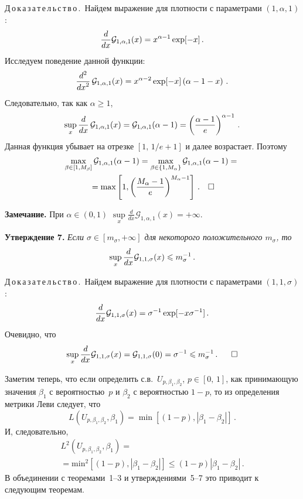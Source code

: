 \begin{multicols}{2}
\smallskip

\noindent
Д\,о\,к\,а\,з\,а\,т\,е\,л\,ь\,с\,т\,в\,о\,.\ 
Найдем выражение для плотности с параметрами $(1,\alpha,1)$:
$$
\displaystyle\frac{\displaystyle d\mathstrut}{\displaystyle dx\mathstrut}{\mathcal G}_{1,\alpha,1}(x) = x^{\alpha-1}\exp [-x]\,.
$$
Исследуем поведение данной функции:
$$
\displaystyle\frac{\displaystyle d^2\mathstrut}{\displaystyle dx^2\mathstrut}\,{\mathcal G}_{1,\alpha,1}(x) =
x^{\alpha-2}\exp[-x]\left(\alpha-1-x\right)\,.
$$
Следовательно, так как $\alpha\geqslant1$,
$$
\sup\limits_x \displaystyle\frac{\displaystyle d\mathstrut}{\displaystyle dx\mathstrut}\,{\mathcal G}_{1,\alpha,1}(x) = {\mathcal
G}_{1,\alpha,1}( \alpha-1 ) =
\left(\displaystyle\frac{\displaystyle \alpha-1\mathstrut}{\displaystyle e\mathstrut}\right)^{\alpha-1}\,.
$$
Данная функция убывает на отрезке $[1,\,1/e+1]$ и далее
возрастает. Поэтому
\begin{multline*}
\max\limits_{\beta\in[1,M_{\beta}]} {\mathcal
G}_{1,\alpha,1}(\alpha-1) = \max\limits_{\beta\in\{1,M_{\alpha}\}}
{\mathcal G}_{1,\alpha,1}(\alpha-1) = {}\\
{}=\max \left[ 1,
\left(\displaystyle\frac{\displaystyle M_{\alpha}-1\mathstrut}{\displaystyle e\mathstrut}\right)^{M_{\alpha}-1}\right]\,.~~~\square
\end{multline*}


\noindent
\textbf{Замечание.} 
При $\alpha\in(0,1)$ $\sup\limits_x \frac{d}{dx}{\mathcal
G}_{1,\alpha,1}(x) = +\infty$.

\medskip

\medskip

\noindent
\textbf{Утверждение 7.}
\textit{Если $\sigma\in[m_{\sigma},+\infty]$ для некоторого положительного
$m_{\sigma}$, то}
$$
\sup\limits_x \displaystyle\frac{\displaystyle d\mathstrut}{\displaystyle dx\mathstrut}{\mathcal G}_{1,1,\sigma}(x) \leqslant
m_{\sigma}^{-1}\,.
$$

\smallskip

\noindent
Д\,о\,к\,а\,з\,а\,т\,е\,л\,ь\,с\,т\,в\,о\,.\
Найдем выражение для плотности с параметрами $(1,1,\sigma)$:
$$
\displaystyle\frac{\displaystyle d\mathstrut}{\displaystyle dx\mathstrut}{\mathcal G}_{1,1,\sigma}(x) =
{\sigma}^{-1}\exp[-x{\sigma}^{-1}]\,.
$$
Очевидно, что
$$
\sup\limits_x \displaystyle\frac{\displaystyle d\mathstrut}{\displaystyle dx\mathstrut}{\mathcal G}_{1,1,\sigma}(x) = {\mathcal
G}_{1,1,\sigma}( 0 ) = {\sigma}^{-1} \leqslant m_{\sigma}^{-1}\,.~~~~~\square
$$

\smallskip

Заметим теперь, что если определить с.в.\ $U_{p,\beta_1,\beta_2}$,
$p\in[0,\,1]$, как принимающую значения $\beta_1$ с вероятностью~$p$
и $\beta_2$ с вероятностью $1-p$, то из определения метрики Леви
следует, что
$$
L(U_{p,\beta_1,\beta_2},\beta_1) = \min[(1-p), |\beta_1-\beta_2|]\,.
$$
И, следовательно,
\begin{multline*}
L^2(U_{p,\beta_1,\beta_2},\beta_1) = {}\\
{}=\mathrm{min}^2\left[(1-p),
|\beta_1-\beta_2|\right] \leqslant (1-p) |\beta_1-\beta_2|\,.
\end{multline*}
В объединении с теоремами~1--3 и
утверждениями~5--7 это приводит к следующим теоремам.


\end{multicols}
